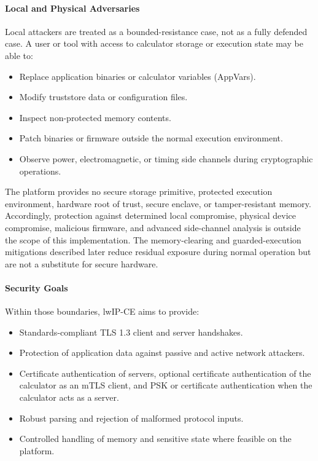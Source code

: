 \documentclass[titlepage]{report}
\begin{document}
	\paragraph{Local and Physical Adversaries}
	
	Local attackers are treated as a bounded-resistance case, not as a fully defended case. A user or tool with access to calculator storage or execution state may be able to:
	
	\begin{itemize}
		\item Replace application binaries or calculator variables (AppVars).
		\item Modify truststore data or configuration files.
		\item Inspect non-protected memory contents.
		\item Patch binaries or firmware outside the normal execution environment.
		\item Observe power, electromagnetic, or timing side channels during cryptographic operations.
	\end{itemize}
	
	The platform provides no secure storage primitive, protected execution environment, hardware root of trust, secure enclave, or tamper-resistant memory. Accordingly, protection against determined local compromise, physical device compromise, malicious firmware, and advanced side-channel analysis is outside the scope of this implementation. The memory-clearing and guarded-execution mitigations described later reduce residual exposure during normal operation but are not a substitute for secure hardware.
	
	\paragraph{Security Goals}
	
	Within those boundaries, lwIP-CE aims to provide:
	
	\begin{itemize}
		\item Standards-compliant TLS 1.3 client and server handshakes.
		\item Protection of application data against passive and active network attackers.
		\item Certificate authentication of servers, optional certificate authentication of the calculator as an mTLS client, and PSK or certificate authentication when the calculator acts as a server.
		\item Robust parsing and rejection of malformed protocol inputs.
		\item Controlled handling of memory and sensitive state where feasible on the platform.
	\end{itemize}
	
\end{document}
